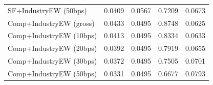 \begin{table}[htbp]
\begin{tabular}{lrrrr}
SF+IndustryEW (50bps) & 0.0409 & 0.0567 & 0.7209 & 0.0673 \\
Comp+IndustryEW (gross) & 0.0433 & 0.0495 & 0.8748 & 0.0625 \\
Comp+IndustryEW (10bps) & 0.0413 & 0.0495 & 0.8334 & 0.0633 \\
Comp+IndustryEW (20bps) & 0.0392 & 0.0495 & 0.7919 & 0.0655 \\
Comp+IndustryEW (30bps) & 0.0372 & 0.0495 & 0.7505 & 0.0701 \\
Comp+IndustryEW (50bps) & 0.0331 & 0.0495 & 0.6677 & 0.0793 \\
\bottomrule
\end{tabular}
\end{table}
